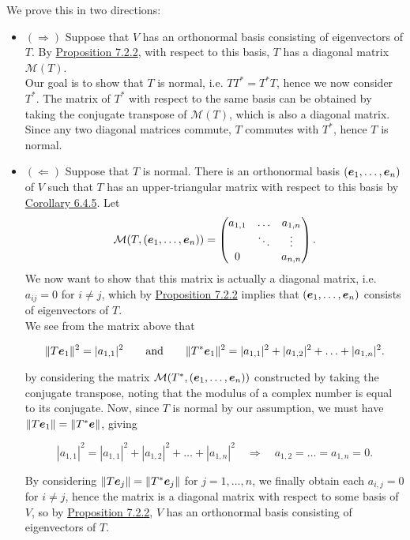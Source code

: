 \documentclass{report}
\newcommand{\cM}{\mathcal{M}}
\begin{document}
	\begin{myproof}
		We prove this in two directions:
		\begin{itemize}
			\item $(\Rightarrow)$ Suppose that $V$ has an orthonormal basis consisting of eigenvectors of $T$. By \hyperref[sec:Prop5]{Proposition 7.2.2}, with respect to this basis, $T$ has a diagonal matrix $\cM(T)$.\\

			Our goal is to show that $T$ is normal, i.e. $TT^*=T^*T$, hence we now consider $T^*$. The matrix of $T^*$ with respect to the same basis can be obtained by taking the conjugate transpose of $\cM(T)$, which is also a diagonal matrix. Since any two diagonal matrices commute, $T$ commutes with $T^*$, hence $T$ is normal.\\
			\item $(\Leftarrow)$ Suppose that $T$ is normal. There is an orthonormal basis $(\boldsymbol{e}_1,\ldots,\boldsymbol{e}_n)$ of $V$ such that $T$ has an upper-triangular matrix with respect to this basis by \hyperref[sec:Cor2]{Corollary 6.4.5}. Let
			$$\cM(T,(\bme_1,\ldots,\bme_n))=\begin{pmatrix}
				a_{1,1} & \ldots & a_{1,n}\\ & \ddots & \vdots \\ 0 & & a_{n,n}
			\end{pmatrix}.$$
			We now want to show that this matrix is actually a diagonal matrix, i.e. $a_{ij}=0$ for $i\neq j$, which by \hyperref[sec:Prop5]{Proposition 7.2.2} implies that $(\boldsymbol{e}_1,\ldots,\boldsymbol{e}_n)$ consists of eigenvectors of $T$.\\
			
			We see from the matrix above that 
			
			$$\|T\boldsymbol{e}_1\|^2=|a_{1,1}|^2 \quad\quad \text{and}\quad\quad \|T^*\boldsymbol{e}_1\|^2=|a_{1,1}|^2+|a_{1,2}|^2+\ldots+|a_{1,n}|^2.$$
			
			by considering the matrix $\cM(T^*,(\bme_1,\ldots,\bme_n))$ constructed by taking the conjugate transpose, noting that the modulus of a complex number is equal to its conjugate. Now, since $T$ is normal by our assumption, we must have $\|T\boldsymbol{e}_1\|=\|T^*\boldsymbol{e}\|$, giving 
			
			$$|a_{1,1}|^2=|a_{1,1}|^2+|a_{1,2}|^2+\ldots+|a_{1,n}|^2 \quad\Rightarrow\quad a_{1,2}=\ldots=a_{1,n}=0.$$
			
			By considering $\|T\boldsymbol{e}_j\|=\|T^*\boldsymbol{e}_j\|$ for $j=1,\ldots,n$, we finally obtain each $a_{i,j}=0$ for $i\neq j$, hence the matrix is a diagonal matrix with respect to some basis of $V$, so by \hyperref[sec:Prop5]{Proposition 7.2.2}, $V$ has an orthonormal basis consisting of eigenvectors of $T$. 
		\end{itemize}
		
	\end{myproof}
\end{document}
